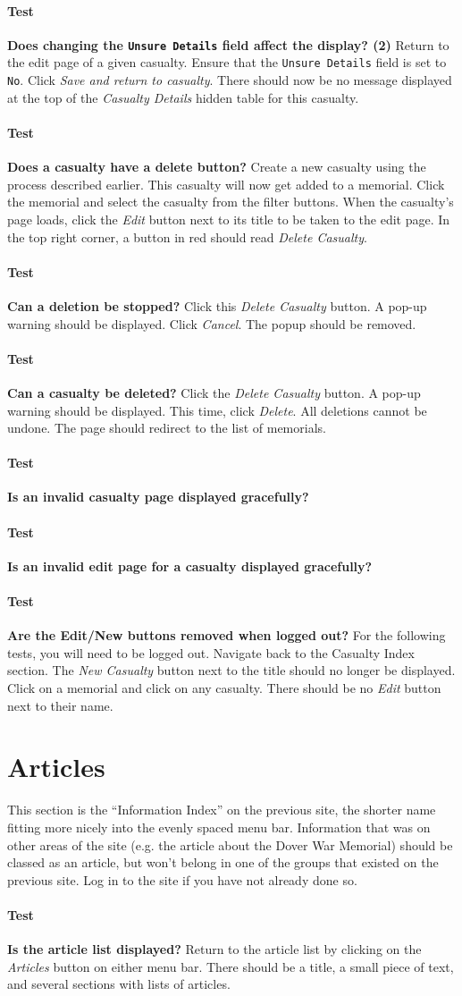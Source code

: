 \documentclass[12pt]{article}
\newcounter{Test}
\newcommand{\test}[1]{%
\stepcounter{Test}%
\paragraph{Test \theTest} \textbf{#1} }
\begin{document}
\test{Does changing the \texttt{Unsure Details} field affect the display? (2)}
Return to the edit page of a given casualty. Ensure that the \texttt{Unsure Details} field is set to \texttt{No}. Click \textit{Save and return to casualty}. There should now be no message displayed at the top of the \textit{Casualty Details} hidden table for this casualty.

\test{Does a casualty have a delete button?}
Create a new casualty using the process described earlier. This casualty will now get added to a memorial. Click the memorial and select the casualty from the filter buttons. When the casualty's page loads, click the \textit{Edit} button next to its title to be taken to the edit page. In the top right corner, a button in red should read \textit{Delete Casualty}.

\test{Can a deletion be stopped?}
Click this \textit{Delete Casualty} button. A pop-up warning should be displayed. Click \textit{Cancel}. The popup should be removed.

\test{Can a casualty be deleted?}
Click the \textit{Delete Casualty} button. A pop-up warning should be displayed. This time, click \textit{Delete}. All deletions cannot be undone. The page should redirect to the list of memorials.

\test{Is an invalid casualty page displayed gracefully?}

\test{Is an invalid edit page for a casualty displayed gracefully?}

\test{Are the Edit/New buttons removed when logged out?}
For the following tests, you will need to be logged out. Navigate back to the Casualty Index section. The \textit{New Casualty} button next to the title should no longer be displayed. Click on a memorial and click on any casualty. There should be no \textit{Edit} button next to their name.

\section{Articles}\label{sec:article}
This section is the ``Information Index'' on the previous site, the shorter name fitting more nicely into the evenly spaced menu bar. Information that was on other areas of the site (e.g. the article about the Dover War Memorial) should be classed as an article, but won't belong in one of the groups that existed on the previous site. Log in to the site if you have not already done so.

\test{Is the article list displayed?}
Return to the article list by clicking on the \textit{Articles} button on either menu bar. There should be a title, a small piece of text, and several sections with lists of articles.
\end{document}
